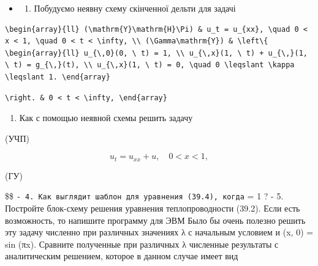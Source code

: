 \documentclass[
  ukrainian,
]{article}
\providecommand{\tightlist}{%
  \setlength{\itemsep}{0pt}\setlength{\parskip}{0pt}}
\begin{document}
\begin{itemize}
\tightlist
\item
  \begin{enumerate}
  \def\labelenumi{\arabic{enumi}.}
  \setcounter{enumi}{1}
  \tightlist
  \item
    Побудуємо неявну схему скінченної дельти для задачі
  \end{enumerate}
\end{itemize}

\begin{verbatim}
\begin{array}{ll} (\mathrm{Y}\mathrm{H}\Pi) & u_t = u_{xx}, \quad 0 < x < 1, \quad 0 < t < \infty, \\ (\Gamma\mathrm{Y}) & \left\{ \begin{array}{ll} u_{\,0}(0, \ t) = 1, \\ u_{\,x}(1, \ t) + u_{\,}(1, \ t) = g_{\,}(t), \\ u_{\,x}(1, \ t) = 0, \quad 0 \leqslant \kappa \leqslant 1. \end{array}
\end{verbatim}

\begin{verbatim}
\right. & 0 < t < \infty, \end{array}
\end{verbatim}

\begin{enumerate}
\def\labelenumi{\arabic{enumi}.}
\setcounter{enumi}{2}
\tightlist
\item
  Как с помощью неявной схемы решить задачу
\end{enumerate}

(УЧП)

\[
u_t = u_{xx} + u, \quad 0 < x < 1,
\]

(ГУ)

\$\$
\texttt{-\ 4.\ Как\ выглядит\ шаблон\ для\ уравнения\ (39.4),\ когда}
\lambda = 1 ? - 5. Постройте блок-схему решения уравнения
теплопроводности (39.2). Если есть возможность, то напишите программу
для ЭВМ Было бы очень полезно решить эту задачу численно при различных
значениях λ с начальным условием и (x, 0) = sin (πx). Сравните
полученные при различных λ численные результаты с аналитическим
решением, которое в данном случае имеет вид
\end{document}

